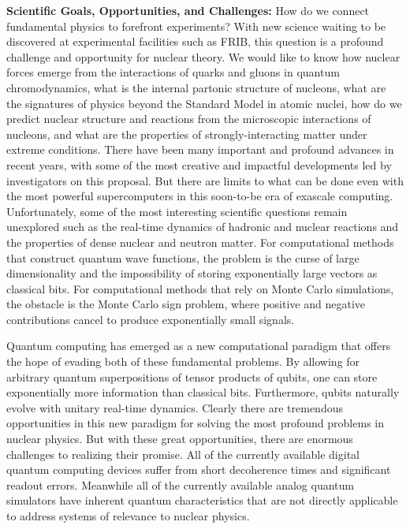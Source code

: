 \documentclass[11pt]{article}
\begin{document}
{\bf Scientific Goals, Opportunities, and Challenges:} 
How do we connect fundamental physics to forefront experiments?  With new science 
waiting to be discovered at experimental facilities such as FRIB, this question is a 
profound challenge and opportunity for nuclear theory.  We would like to know how nuclear forces emerge from the interactions of quarks and gluons in quantum chromodynamics, what is the internal partonic structure of nucleons, what are the signatures of physics beyond the Standard Model in atomic nuclei, how do we predict nuclear structure and reactions from the microscopic interactions of nucleons, and what are the properties of strongly-interacting matter under extreme conditions.  There have been many important and profound advances in recent years, with some of the most creative and impactful developments led by investigators on this proposal.  But there are limits to what can be done even with the most powerful supercomputers in this soon-to-be era of exascale computing.  Unfortunately, some of the most interesting scientific questions remain unexplored such as the real-time dynamics of hadronic and nuclear reactions and the properties of dense nuclear and neutron matter. For computational methods that construct quantum wave functions, the problem is the curse of large dimensionality and the impossibility of storing exponentially large vectors as classical bits.  For computational methods that rely on Monte Carlo simulations, the obstacle is the Monte Carlo sign problem, where positive and negative contributions cancel to produce exponentially small signals.

Quantum computing has emerged as a new computational paradigm that offers the hope of evading both of these fundamental problems.  By allowing for arbitrary quantum superpositions of tensor products of qubits, one can store exponentially more information than classical bits.  Furthermore, qubits naturally evolve with unitary real-time dynamics. Clearly there are tremendous opportunities in this new paradigm for solving the most profound problems in nuclear physics.  But with these great opportunities, there are enormous challenges to realizing their promise.  All of the currently available digital quantum computing devices suffer from short decoherence times and significant readout errors.  Meanwhile all of the currently available analog quantum simulators have inherent quantum characteristics that are not directly applicable to address systems of relevance to nuclear physics.
\end{document}
